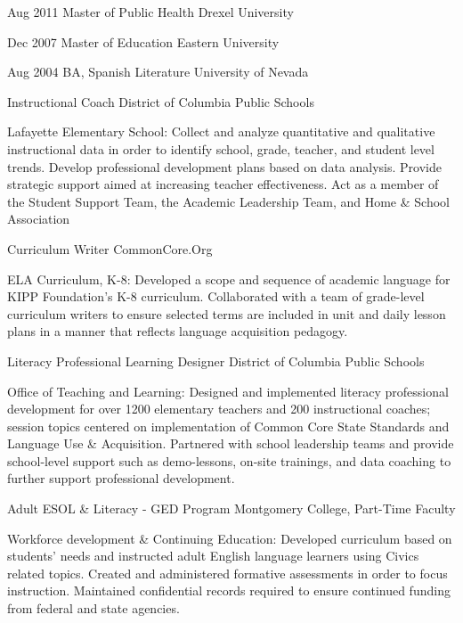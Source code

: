 \documentclass[]{scrartcl}
\begin{document}
\begin{cleanCV}
\WorkExperience
{Aug 2011}
{Master of Public Health}
{Drexel University}

\WorkExperience
{Dec 2007}
{Master of Education}
{Eastern University}

\WorkExperience
{Aug 2004}
{BA, Spanish Literature}
{University of Nevada}


{Instructional Coach}
{District of Columbia Public Schools}

\JobDesc
{Lafayette Elementary School: }
{Collect and analyze quantitative and qualitative instructional data in order to identify school, grade, teacher, and student level trends. Develop professional development plans based on data analysis. Provide strategic support aimed at increasing teacher effectiveness. Act as a member of the  Student Support Team, the Academic Leadership Team, and Home \& School Association}

{Curriculum Writer}
{CommonCore.Org}

\JobDesc
{ELA Curriculum, K-8: }
{Developed a scope and sequence of academic language for KIPP Foundation's K-8 curriculum. Collaborated with a team of grade-level curriculum writers to ensure selected terms are included in unit and daily lesson plans in a manner that reflects language acquisition pedagogy.}

{Literacy Professional Learning Designer}
{District of Columbia Public Schools}

\JobDesc
{Office of Teaching and Learning: }
{Designed and implemented literacy professional development for over 1200 elementary teachers and 200 instructional coaches; session topics centered on implementation of Common Core State Standards and Language Use \& Acquisition. Partnered with school leadership teams and provide school-level support such as demo-lessons, on-site trainings, and data coaching to further support professional development.}

{Adult ESOL \& Literacy - GED Program}
{Montgomery College, Part-Time Faculty}

\JobDesc
{Workforce development \& Continuing Education: }
{Developed curriculum based on students' needs and instructed adult English language learners using Civics related topics. Created and administered formative assessments in order to focus instruction. Maintained confidential records required to ensure continued funding from federal and state agencies.}


\end{cleanCV}
\end{document}

